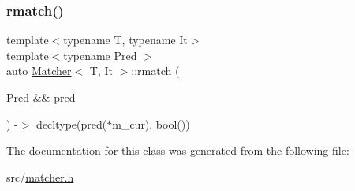 \mbox{\label{class_matcher_ad0b897b87cede7752c385e7d55bcaff4}} 
\subsubsection{\texorpdfstring{rmatch()}{rmatch()}\hspace{0.1cm}{\footnotesize\ttfamily [2/2]}}
{\footnotesize\ttfamily template$<$typename T, typename It$>$ \\
template$<$typename Pred $>$ \\
auto \hyperlink{class_matcher}{Matcher}$<$ T, It $>$\+::rmatch (\begin{DoxyParamCaption}\item[{Pred \&\&}]{pred }\end{DoxyParamCaption}) -\/$>$ decltype(pred($\ast$m\+\_\+cur), bool())
  \hspace{0.3cm}{\ttfamily [inline]}}



The documentation for this class was generated from the following file\+:\begin{DoxyCompactItemize}
\item 
src/\hyperlink{matcher_8h}{matcher.\+h}\end{DoxyCompactItemize}
